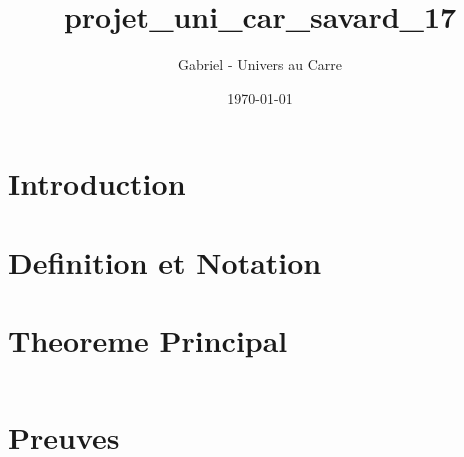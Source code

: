 \documentclass[12pt]{article}
\title{projet_uni_car_savard_17}
\author{Gabriel - Univers au Carre}
\date{\today}
\begin{document}
\maketitle


\section{Introduction}



\section{Definition et Notation}



\section{Theoreme Principal}


\begin{equation}
\end{equation}


\section{Preuves}


\end{document}
